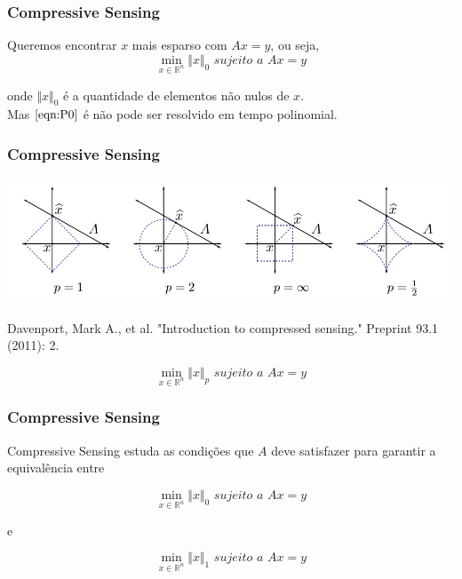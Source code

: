 \documentclass[11pt]{beamer}
\begin{document}
\begin{frame}
\frametitle{Compressive Sensing}
Queremos encontrar $x$ mais esparso com $Ax = y$, ou seja,
\begin{equation}
\min_{x \in \mathbb{R}^n} \Vert x \Vert_0 \textit{ sujeito a } Ax = y
\tag{$P_0$}
\label{eqn:P0}
\end{equation}

onde $\Vert x \Vert_0$ é a quantidade de elementos não nulos de $x$. \\

Mas $\eqref{eqn:P0}$ é não pode ser resolvido em tempo polinomial.
\end{frame}

\begin{frame}
\frametitle{Compressive Sensing}
\begin{center}
\includegraphics[scale=.4]{imagens/normas.png}

\tiny{Davenport, Mark A., et al. "Introduction to compressed sensing." Preprint 93.1 (2011): 2.}
\end{center}
\begin{equation}
\min_{x \in \mathbb{R}^n} \Vert x \Vert_p \textit{ sujeito a } Ax = y
\tag{$P_p$}
\label{eqn:Pp}
\end{equation}
\end{frame}

\begin{frame}
\frametitle{Compressive Sensing}
Compressive Sensing estuda as condições que $A$ deve satisfazer para garantir a equivalência entre

\begin{equation}
\min_{x \in \mathbb{R}^n} \Vert x \Vert_0 \textit{ sujeito a } Ax = y
\tag{$P_0$}
\end{equation}

e

\begin{equation}
\min_{x \in \mathbb{R}^n} \Vert x \Vert_1 \textit{ sujeito a } Ax = y
\tag{$P_1$}
\label{eqn:P1}
\end{equation}
\end{frame}
\end{document}
